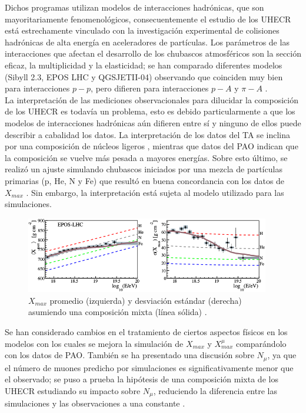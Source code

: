 Dichos programas utilizan modelos de interacciones hadrónicas, que son mayoritariamente fenomenológicos, consecuentemente el estudio de los UHECR está estrechamente vinculado con la investigación experimental de colisiones hadrónicas de alta energía en aceleradores de partículas. Los parámetros de las interacciones que afectan el desarrollo de los chubascos atmosféricos son la sección eficaz, la multiplicidad y la elasticidad; se han comparado diferentes modelos (Sibyll 2.3, EPOS LHC y QGSJETII-04) observando que coinciden muy bien para interacciones $p-p$, pero difieren para interacciones $p-A$ y $\pi-A$ \cite{Pierog2018}. \\

La interpretación de las mediciones observacionales para dilucidar la composición de los UHECR es todavía un problema, esto es debido particularmente a que los modelos de interacciones hadrónicas aún difieren entre sí y ninguno de ellos puede describir a cabalidad los datos. La interpretación de los datos del TA se inclina por una composición de núcleos ligeros \cite{TAcomposition}, mientras que datos del PAO indican que la composición se vuelve más pesada a mayores energías. Sobre esto último, se realizó un ajuste simulando chubascos iniciados por una mezcla de partículas primarias (p, He, N y Fe) que resultó en buena concordancia con los datos de $X_{max}$ \cite{PAOcomposition}. Sin embargo, la interpretación está sujeta al modelo utilizado para las simulaciones.\\

\begin{figure}[h]
\centering
\includegraphics[width=0.95\textwidth]{Figuras/Xmax_PAO} 
\caption{$X_{max}$ promedio (izquierda) y desviación estándar (derecha) asumiendo una composición mixta (línea sólida) \cite{PAOcomposition}.}
\label{fig:Xmax}
\end{figure}	

Se han considerado cambios en el tratamiento de ciertos aspectos físicos en los modelos \cite{Ostapchenko2019} con los cuales se mejora la simulación de $X_{max}$ y $X_{max}^{\mu}$ comparándolo con los datos de PAO. También se ha presentado una discusión sobre $N_{\mu}$, ya que el número de muones predicho por simulaciones es significativamente menor que el observado; se puso a prueba la hipótesis de una composición mixta de los UHECR estudiando su impacto sobre $N_{\mu}$, reduciendo la diferencia entre las simulaciones y las observaciones a una constante \cite{Sciutto2019}.

